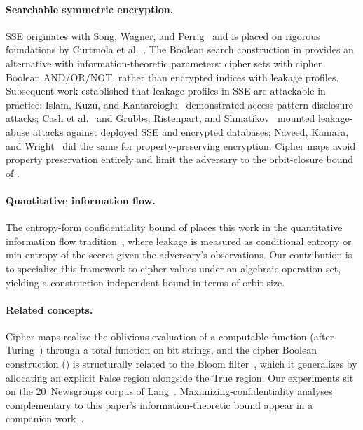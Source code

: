 \documentclass[11pt]{article}
\theoremstyle{definition}
\theoremstyle{plain}
\theoremstyle{remark}
\begin{document}
\paragraph{Searchable symmetric encryption.}
SSE originates with Song, Wagner, and
Perrig~\cite{song2000practical} and is placed on rigorous
foundations by Curtmola et al.~\cite{curtmola2006searchable}.
The Boolean search construction in  provides
an alternative with information-theoretic parameters: cipher sets
with cipher Boolean AND/OR/NOT, rather than encrypted indices with
leakage profiles.
Subsequent work established that leakage profiles in SSE are
attackable in practice: Islam, Kuzu, and
Kantarcioglu~\cite{islam2012access} demonstrated access-pattern
disclosure attacks; Cash et al.~\cite{cash2015leakage} and
Grubbs, Ristenpart, and Shmatikov~\cite{grubbs2017leakage} mounted
leakage-abuse attacks against deployed SSE and encrypted databases;
Naveed, Kamara, and Wright~\cite{naveed2015inference} did the same for
property-preserving encryption.
Cipher maps avoid property preservation entirely and limit the
adversary to the orbit-closure bound of
.

\paragraph{Quantitative information flow.}
The entropy-form confidentiality bound of
 places this work in the quantitative
information flow tradition~\cite{smith2009foundations}, where leakage
is measured as conditional entropy or min-entropy of the secret given
the adversary's observations.
Our contribution is to specialize this framework to cipher values
under an algebraic operation set, yielding a construction-independent
bound in terms of orbit size.

\paragraph{Related concepts.}
Cipher maps realize the oblivious evaluation of a computable function
(after Turing~\cite{turing1936computable}) through a total function on
bit strings, and the cipher Boolean construction
() is structurally related to the Bloom
filter~\cite{bloom1970space}, which it generalizes by allocating an
explicit False region alongside the True region.
Our experiments sit on the 20~Newsgroups corpus of
Lang~\cite{lang1995newsweeder}.
Maximizing-confidentiality analyses complementary to this paper's
information-theoretic bound appear in a companion
work~\cite{towell2026maxconf}.
\end{document}
